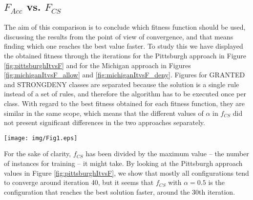 
\subsection{$F_{Acc}$ vs. $F_{CS}$} 
\label{subsec:fitnesscomparison}

The aim of this comparison is to conclude which fitness function should be used, discussing the results from the point of view of convergence, and that means finding which one reaches the best value faster. To study this we have displayed the obtained fitness through the iterations for the Pittsburgh approach in Figure \ref{fig:pittsburghItvsF} and for the Michigan approach in Figures \ref{fig:michiganItvsF_allow} and \ref{fig:michiganItvsF_deny}. Figures for GRANTED and STRONGDENY classes are separated because the solution is a single rule instead of a set of rules, and therefore the algorithm has to be executed once per class. With regard to the best fitness obtained for each fitness function, they are similar in the same scope, which means that the different values of $\alpha$ in $f_{CS}$ did not present significant differences in the two approaches separately.

\begin{figure*}[h!tb]
\centering
\texttt{[image: img/Fig1.eps]}
\caption{Convergence of fitness for each one of the tested fitness
  functions, and for Pittsburgh approach. Note that $f_{Acc}$ has to
  be maximised, whereas $f_{CS}$ has to be minimised.}
\label{fig:pittsburghItvsF}
\end{figure*}

For the sake of clarity, $f_{CS}$ has been divided by the maximum
value -- the number of instances for training -- it might take. By
looking at the Pittsburgh approach values in Figure
\ref{fig:pittsburghItvsF}, we show that mostly all configurations tend to converge around iteration 40, but it seems that $f_{CS}$ with
$\alpha = 0.5$ is the configuration that reaches the best solution
faster, around the 30th iteration.  

